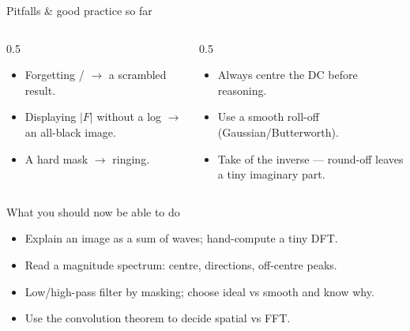 \documentclass[10pt,aspectratio=169]{beamer}
\begin{document}
\begin{frame}{Pitfalls \& good practice so far}
  \begin{columns}[T]
    \begin{column}{0.5\textwidth}
      \begin{badbox}
        \begin{itemize}
          \item Forgetting / $\rightarrow$ a scrambled result.
          \item Displaying $|F|$ without a log $\rightarrow$ an all-black image.
          \item A hard mask $\rightarrow$ ringing.
        \end{itemize}
      \end{badbox}
    \end{column}
    \begin{column}{0.5\textwidth}
      \begin{goodbox}
        \begin{itemize}
          \item Always centre the DC before reasoning.
          \item Use a smooth roll-off (Gaussian/Butterworth).
          \item Take  of the inverse — round-off leaves a tiny imaginary part.
        \end{itemize}
      \end{goodbox}
    \end{column}
  \end{columns}
\end{frame}

\begin{frame}{What you should now be able to do}
  \begin{itemize}
    \item Explain an image as a sum of waves; hand-compute a tiny DFT.
    \item Read a magnitude spectrum: centre, directions, off-centre peaks.
    \item Low/high-pass filter by masking; choose ideal vs smooth and know why.
    \item Use the convolution theorem to decide spatial vs FFT.
  \end{itemize}
\end{frame}
\end{document}
